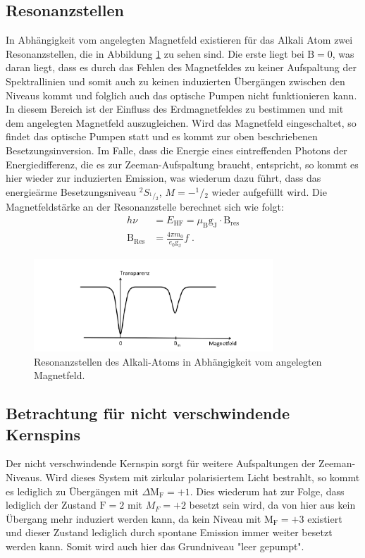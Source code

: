 \subsection{Resonanzstellen}
In Abhängigkeit vom angelegten Magnetfeld existieren für das Alkali Atom zwei Resonanzstellen, die in Abbildung \ref{abb:Resonanz} zu sehen sind. Die erste liegt bei $\text{B}=0$, was daran liegt, dass es durch das Fehlen des Magnetfeldes zu keiner Aufspaltung der Spektrallinien und somit auch zu keinen induzierten Übergängen zwischen den Niveaus kommt und folglich auch das optische Pumpen nicht funktionieren kann.
In diesem Bereich ist der Einfluss des Erdmagnetfeldes zu bestimmen und mit dem angelegten Magnetfeld auszugleichen.
Wird das Magnetfeld eingeschaltet, so findet das optische Pumpen statt und es kommt zur oben beschriebenen Besetzungsinversion.
Im Falle, dass die Energie eines eintreffenden Photons der Energiedifferenz, die es zur Zeeman-Aufspaltung braucht, entspricht, so kommt es hier wieder zur induzierten Emission, was wiederum dazu führt, dass das energieärme Besetzungsniveau ${}^2S_{{}^1\!/\!_2}$, $M=-^1\!/\!_2$ wieder aufgefüllt wird.
Die Magnetfeldstärke an der Resonanzstelle berechnet sich wie folgt:
\begin{align}
  \label{eq:2}
    h \nu &= E_{\text{HF}} = \mu_{\text{B}} \text{g}_{\text{J}} \cdot \text{B}_{\text{res}} \\
    \text{B}_{\text{Res}} &= \frac{4\pi m_0}{e_0 \text{g}_{\text{J}}}f \; .
\end{align}
\FloatBarrier
\begin{figure}
    \centering
    \includegraphics[width=0.8\textwidth]{Resonanz.PNG}
    \caption{Resonanzstellen des Alkali-Atoms in Abhängigkeit vom angelegten Magnetfeld. \cite{Q1}}
    \label{abb:Resonanz}
\end{figure}
\FloatBarrier

\subsection{Betrachtung für nicht verschwindende Kernspins}
Der nicht verschwindende Kernspin sorgt für weitere Aufspaltungen der Zeeman-Niveaus.
Wird dieses System mit zirkular polarisiertem Licht bestrahlt, so kommt
es lediglich zu Übergängen mit $\Delta \text{M}_{\text{F}} = +1$.
Dies wiederum hat zur Folge, dass lediglich der Zustand $\text{F}=2$ mit $M_F=+2$ besetzt sein wird, da von hier aus kein Übergang mehr induziert werden kann, da kein Niveau mit $\text{M}_{\text{F}}=+3$ existiert und dieser Zustand lediglich durch spontane Emission immer weiter besetzt werden kann.
Somit wird auch hier das Grundniveau "leer gepumpt".

